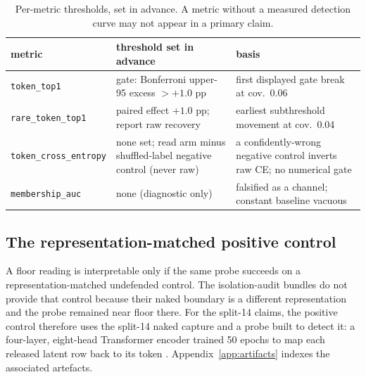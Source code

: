 \documentclass[11pt]{article}
\begin{document}
\begin{table}[H]
\centering\scriptsize
\begin{tabularx}{\textwidth}{@{}>{\raggedright\arraybackslash}p{3.2cm}>{\raggedright\arraybackslash}X>{\raggedright\arraybackslash}X@{}}
\toprule
metric & threshold set in advance & basis \\
\midrule
\texttt{token\_top1} & gate: Bonferroni upper-95 excess $>+1.0$ pp & first displayed gate break at cov.\ 0.06 \\
\texttt{rare\_token\_top1} & paired effect $+1.0$ pp; report raw recovery & earliest subthreshold movement at cov.\ 0.04 \\
\texttt{token\_cross\_entropy} & none set; read arm minus shuffled-label negative control (never raw) & a confidently-wrong negative control inverts raw CE; no numerical gate \\
\texttt{membership\_auc} & none (diagnostic only) & falsified as a channel; constant baseline vacuous \\
\bottomrule
\end{tabularx}


\caption{Per-metric thresholds, set in advance. A
metric without a measured detection curve may not appear in a primary claim.}
\label{tab:thresholds}
\end{table}

\subsection{The representation-matched positive control}
\label{sec:positive_control}

A floor reading is interpretable only if the same probe succeeds on a
representation-matched undefended control. The isolation-audit bundles do not
provide that control because their naked boundary is a different
representation and the probe remained near floor there. For the split-14
claims, the positive control therefore uses the split-14 naked capture and a
probe built to detect it: a four-layer, eight-head Transformer encoder trained
50 epochs to map each released latent row back to its token
. Appendix~\ref{app:artifacts}
indexes the associated artefacts.
\end{document}
